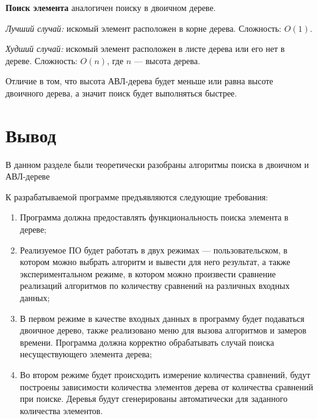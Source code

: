 \textbf{Поиск элемента} аналогичен поиску в двоичном дереве.

\textit{Лучший случай:} искомый элемент расположен в корне дерева. Сложность: $O(1)$.

\textit{Худший случай:} искомый элемент расположен в листе дерева или его нет в дереве. Сложность: $O(n)$, где $n$ --- высота дерева.

Отличие в том, что высота АВЛ-дерева будет меньше или равна высоте двоичного дерева, а значит поиск будет выполняться быстрее. 

\section{Вывод}

В данном разделе были теоретически разобраны алгоритмы поиска в двоичном и АВЛ-дереве

К разрабатываемой программе предъявляются следующие требования:
\begin{enumerate}
	\item Программа должна предоставлять функциональность поиска элемента в дереве;
	
	\item Реализуемое ПО будет работать в двух режимах --- пользовательском, в котором можно выбрать алгоритм и вывести для него результат, а также экспериментальном режиме, в котором можно произвести сравнение реализаций алгоритмов по количеству сравнений на различных входных данных;
	
	\item В первом режиме в качестве входных данных в программу будет подаваться двоичное дерево, также реализовано меню для вызова алгоритмов и замеров времени. Программа должна корректно обрабатывать случай поиска несуществующего элемента дерева;
	
	\item Во втором режиме будет происходить измерение количества сравнений, будут построены зависимости количества элементов дерева от количества сравнений при поиске. Деревья будут сгенерированы автоматически для заданного количества элементов.
\end{enumerate}